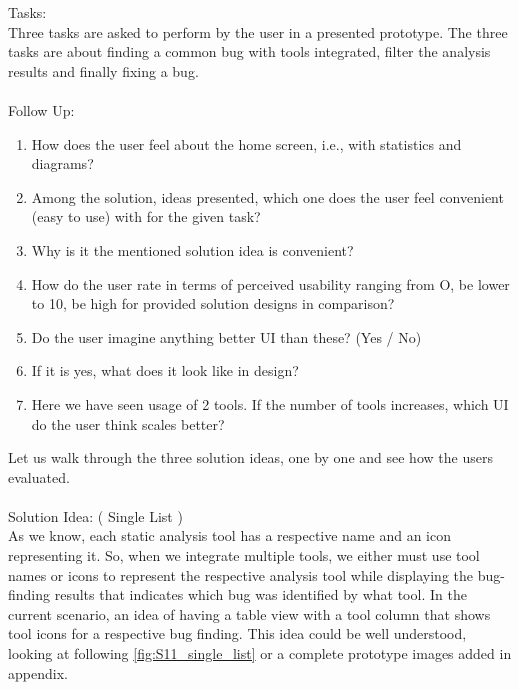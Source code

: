 Tasks: \\

Three tasks are asked to perform by the user in a presented prototype. The three tasks are about finding a common bug with tools integrated, filter the analysis results and finally fixing a bug. \\ \\

Follow Up: \\

\begin{enumerate}
\item How does the user feel about the home screen, i.e., with statistics and diagrams? 
\item Among the solution, ideas presented, which one does the user feel convenient (easy to use) with for the given task?
\item Why is it the mentioned solution idea is convenient?
\item How do the user rate in terms of perceived usability ranging from O, be lower to 10, be high for provided solution designs in comparison?
\item Do the user imagine anything better UI than these? (Yes / No)
\item If it is yes, what does it look like in design?
\item Here we have seen usage of 2 tools. If the number of tools increases, which UI do the user think scales better?
\end{enumerate}


Let us walk through the three solution ideas, one by one and see how the users evaluated. \\ \\

Solution Idea: ( Single List ) \\

As we know, each static analysis tool has a respective name and an icon representing it. So, when we integrate multiple tools, we either must use tool names or icons to represent the respective analysis tool while displaying the bug-finding results that indicates which bug was identified by what tool. In the current scenario, an idea of having a table view with a tool column that shows tool icons for a respective bug finding. This idea could be well understood, looking at following \ref{fig:S11_single_list} or a complete prototype images added in appendix. \\ \\

